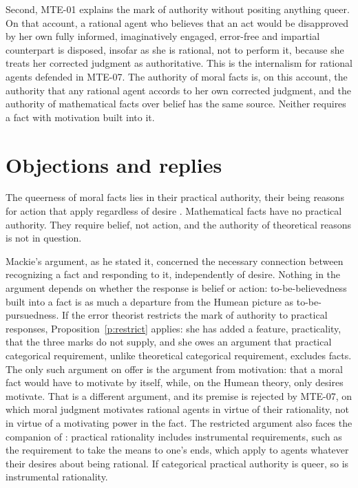 \documentclass{situationist-preprint}
\begin{document}
Second, MTE-01 explains the mark of authority without positing anything queer. On that account, a rational agent who believes that an act would be disapproved by her own fully informed, imaginatively engaged, error-free and impartial counterpart is disposed, insofar as she is rational, not to perform it, because she treats her corrected judgment as authoritative. This is the internalism for rational agents defended in MTE-07. The authority of moral facts is, on this account, the authority that any rational agent accords to her own corrected judgment, and the authority of mathematical facts over belief has the same source. Neither requires a fact with motivation built into it.

\section{Objections and replies}\label{s:obj}

\begin{objection}
The queerness of moral facts lies in their practical authority, their being reasons for action that apply regardless of desire \citep{Joyce2001,Olson2014}. Mathematical facts have no practical authority. They require belief, not action, and the authority of theoretical reasons is not in question.
\end{objection}

\begin{reply}
Mackie's argument, as he stated it, concerned the necessary connection between recognizing a fact and responding to it, independently of desire. Nothing in the argument depends on whether the response is belief or action: to-be-believedness built into a fact is as much a departure from the Humean picture as to-be-pursuedness. If the error theorist restricts the mark of authority to practical responses, Proposition~\ref{p:restrict} applies: she has added a feature, practicality, that the three marks do not supply, and she owes an argument that practical categorical requirement, unlike theoretical categorical requirement, excludes facts. The only such argument on offer is the argument from motivation: that a moral fact would have to motivate by itself, while, on the Humean theory, only desires motivate. That is a different argument, and its premise is rejected by MTE-07, on which moral judgment motivates rational agents in virtue of their rationality, not in virtue of a motivating power in the fact. The restricted argument also faces the companion of \citet{Cuneo2007}: practical rationality includes instrumental requirements, such as the requirement to take the means to one's ends, which apply to agents whatever their desires about being rational. If categorical practical authority is queer, so is instrumental rationality.
\end{reply}
\end{document}
